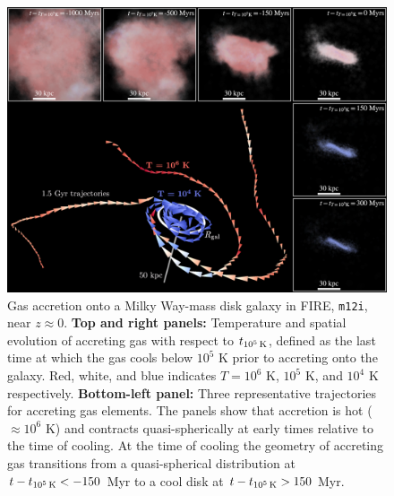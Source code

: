 \documentclass[fleqn,usenatbib]{mnras}
\newcommand{\tcools}{t_{10^5\,{\rm K}}}
\begin{document}
\begin{figure}
    \centering
    \includegraphics[width=\textwidth]{figures/illustrative_tracks/illustrative_tracks.png}
    \caption{
Gas accretion onto a Milky Way-mass disk galaxy in FIRE, \texttt{m12i}, near $z\approx0$.
\textbf{Top and right panels:}
Temperature and spatial evolution of accreting gas with respect to $\tcools$, defined as the last time at which the gas cools below $10^5$ K prior to accreting onto the galaxy.
Red, white, and blue indicates $T=10^6$ K, $10^5$ K, and $10^4$ K respectively. 
\textbf{Bottom-left panel:}
Three representative trajectories for accreting gas elements.
The panels show that accretion is hot ($\approx 10^6$ K) and contracts quasi-spherically at early times relative to the time of cooling.
At the time of cooling the geometry of accreting gas transitions from a quasi-spherical distribution at $t-\tcools < -150$ Myr to a cool disk at $t-\tcools > 150$ Myr.
    }
    \label{f: overview}
\end{figure}
\end{document}
